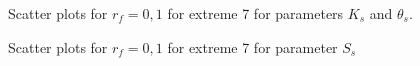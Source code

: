 \documentclass[review]{elsarticle}
\begin{document}
\begin{figure}[htb!]
\label{ext6rf0-Kt2}
\caption{Scatter plots for $r_f=0,1$ for extreme 7 for parameters $K_s$ and $\theta_s$. }
\end{figure}

\begin{figure}[htb!]
\label{ext6rf0-Ss2}
\caption{Scatter plots for $r_f=0,1$ for extreme 7 for parameter $S_s$}
\end{figure}
\end{document}
